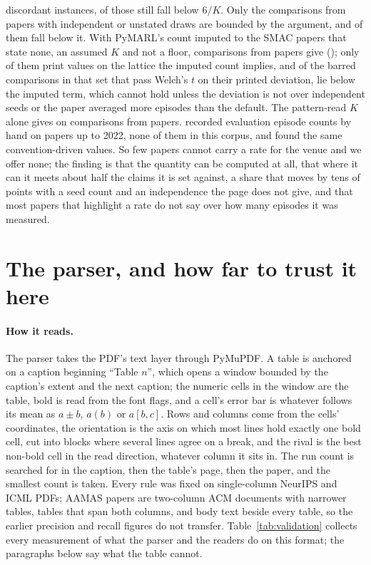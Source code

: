 \documentclass[sigconf,anonymous]{aamas}
\begin{document}
discordant instances, \nPtwoResTypedSharedPairedBelow{} of those
\nPtwoResTypedSharedN{} still fall below $6/K$. Only the
\nPtwoResTypedIndepN{} comparisons from \nPtwoResTypedIndepPapers{}
papers with independent or unstated draws are bounded by the argument,
and \nPtwoResTypedIndepBelow{} of them fall below it. With PyMARL's count
imputed to the SMAC papers that state none, an assumed $K$ and not a
floor, \nPtwoResInheritedN{} comparisons from \nPtwoResInheritedPapers{}
papers give \nPtwoResInheritedBelow{} (\nPtwoResInheritedBelowPaperCi{});
only \nPtwoResInheritedLatticeConsistent{} of them print values on the
lattice the imputed count implies, and of the
\nPtwoResInheritedWelchPass{} barred comparisons in that set that pass
Welch's $t$ on their printed deviation,
\nPtwoResInheritedWelchPassBelow{} lie below the imputed term, which
cannot hold unless the deviation is not over independent seeds or the
paper averaged more episodes than the default. The pattern-read $K$
alone gives \nResBelowPct{} on \nResWithK{} comparisons from
\nResPapers{} papers. \citet{gorsane2022towards} recorded evaluation
episode counts by hand on papers up to 2022, none of them in this corpus,
and found the same convention-driven values. So few papers cannot carry a
rate for the venue and we offer none; the finding is that the quantity
can be computed at all, that where it can it meets about half the claims
it is set against, a share that moves by tens of points with a seed
count and an independence the page does not give, and that most papers
that highlight a rate do not say over how many episodes it was measured.

\section{The parser, and how far to trust it here}
\label{sec:instrument}

\paragraph{How it reads.} The parser takes the PDF's text layer through
PyMuPDF. A table is anchored on a caption beginning ``Table $n$'', which
opens a window bounded by the caption's extent and the next caption; the
numeric cells in the window are the table, bold is read from the font
flags, and a cell's error bar is whatever follows its mean as $a \pm b$,
$a(b)$ or $a[b, c]$. Rows and columns come from the cells' coordinates,
the orientation is the axis on which most lines hold exactly one bold
cell, cut into blocks where several lines agree on a break, and the rival
is the best non-bold cell in the read direction, whatever column it sits
in. The run count is searched for in the caption, then the table's page,
then the paper, and the smallest count is taken. Every rule was fixed on
single-column NeurIPS and ICML PDFs; AAMAS papers are two-column ACM
documents with narrower tables, tables that span both columns, and body
text beside every table, so the earlier precision and recall figures do
not transfer. Table~\ref{tab:validation} collects every measurement of
what the parser and the readers do on this format; the paragraphs below
say what the table cannot.
\end{document}
